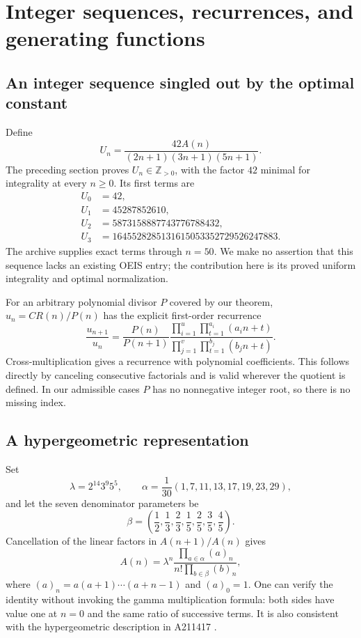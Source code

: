 \documentclass[11pt]{article}
\theoremstyle{definition}
\theoremstyle{remark}
\newcommand{\Z}{\mathbb Z}
\begin{document}
\section{Integer sequences, recurrences, and generating functions}
\subsection{An integer sequence singled out by the optimal constant}
Define
\begin{equation}\label{eq:U}
 U_n=\frac{42A(n)}{(2n+1)(3n+1)(5n+1)}.
\end{equation}
The preceding section proves $U_n\in\Z_{>0}$, with the factor $42$
minimal for integrality at every $n\geq0$. Its first terms are
\begin{align*}
 U_0&=42,\\
 U_1&=45287852610,\\
 U_2&=5873158887743776788432,\\
 U_3&=1645528285131615053352729526247883.
\end{align*}
The archive supplies exact terms through $n=50$. We make no assertion
that this sequence lacks an existing OEIS entry; the contribution here
is its proved uniform integrality and optimal normalization.

For an arbitrary polynomial divisor $P$ covered by our theorem,
$u_n=CR(n)/P(n)$ has the explicit first-order recurrence
\begin{equation}\label{eq:genericrecurrence}
 \frac{u_{n+1}}{u_n}
 =\frac{P(n)}{P(n+1)}
 \frac{\displaystyle\prod_{i=1}^u\prod_{t=1}^{a_i}(a_i n+t)}
      {\displaystyle\prod_{j=1}^v\prod_{t=1}^{b_j}(b_j n+t)}.
\end{equation}
Cross-multiplication gives a recurrence with polynomial coefficients.
This follows directly by canceling consecutive factorials and is
valid wherever the quotient is defined. In our admissible cases
$P$ has no nonnegative integer root, so there is no missing index.

\subsection{A hypergeometric representation}
Set
\[
 \lambda=2^{14}3^9 5^5,
 \qquad
 \alpha=\frac1{30}(1,7,11,13,17,19,23,29),
\]
and let the seven denominator parameters be
\[
 \beta=\left(\frac12,\frac13,\frac23,
                    \frac15,\frac25,\frac35,\frac45\right).
\]
Cancellation of the linear factors in $A(n+1)/A(n)$ gives
\begin{equation}\label{eq:Apock}
 A(n)=\lambda^n\frac{\prod_{a\in\alpha}(a)_n}
                         {n!\prod_{b\in\beta}(b)_n},
\end{equation}
where $(a)_n=a(a+1)\cdots(a+n-1)$ and $(a)_0=1$.
One can verify the identity without invoking the gamma multiplication
formula: both sides have value one at $n=0$ and the same ratio of
successive terms. It is also consistent with the hypergeometric
description in A211417 \cite{oeisA}.
\end{document}
